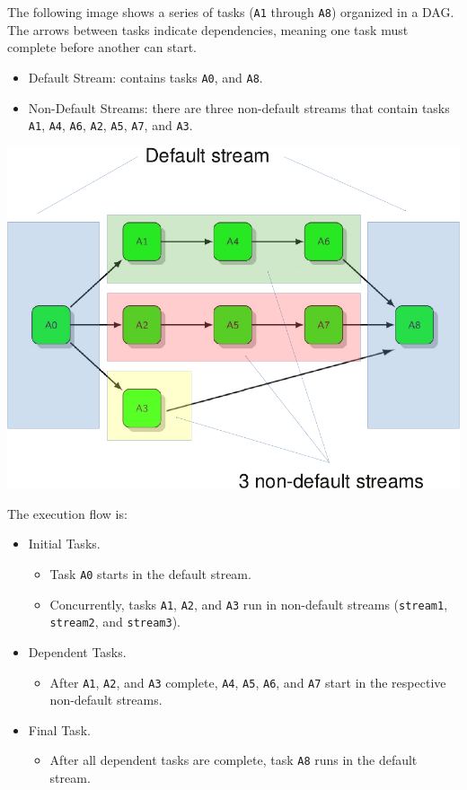 \begin{examplebox}[: DAG]
    The following image shows a series of tasks (\texttt{A1} through \texttt{A8}) organized in a DAG. The arrows between tasks indicate dependencies, meaning one task must complete before another can start.
    \begin{itemize}
        \item Default Stream: contains tasks \texttt{A0}, and \texttt{A8}.
        \item Non-Default Streams: there are three non-default streams that contain tasks \texttt{A1}, \texttt{A4}, \texttt{A6}, \texttt{A2}, \texttt{A5}, \texttt{A7}, and \texttt{A3}.
    \end{itemize}
    \begin{center}
        \includegraphics[width=.8\textwidth]{img/cuda-stream-dag-1.pdf}
    \end{center}

    The execution flow is:
    \begin{itemize}
        \item Initial Tasks.
        \begin{itemize}
            \item Task \texttt{A0} starts in the default stream.
            \item Concurrently, tasks \texttt{A1}, \texttt{A2}, and \texttt{A3} run in non-default streams (\texttt{stream1}, \texttt{stream2}, and \texttt{stream3}).
        \end{itemize}
        \item Dependent Tasks.
        \begin{itemize}
            \item After \texttt{A1}, \texttt{A2}, and \texttt{A3} complete, \texttt{A4}, \texttt{A5}, \texttt{A6}, and \texttt{A7} start in the respective non-default streams.
        \end{itemize}
        \item Final Task.
        \begin{itemize}
            \item After all dependent tasks are complete, task \texttt{A8} runs in the default stream.
        \end{itemize}
    \end{itemize}


\end{examplebox}
